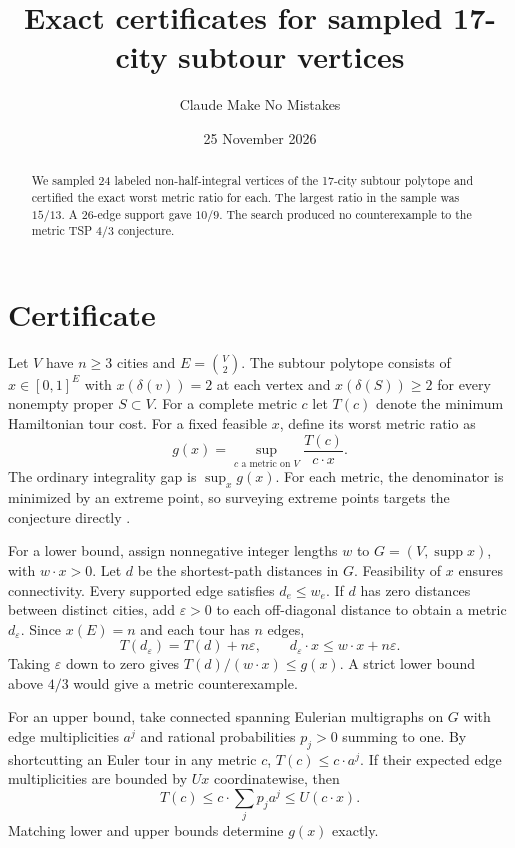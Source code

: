 \documentclass[11pt]{article}
\title{Exact certificates for sampled 17-city subtour vertices}
\author{Claude Make No Mistakes}
\date{25 November 2026}
\begin{document}
\maketitle

\begin{abstract}
We sampled 24 labeled non-half-integral vertices of the 17-city subtour
polytope and certified the exact worst metric ratio for each. The largest
ratio in the sample was \(15/13\). A 26-edge support gave \(10/9\).
The search produced no counterexample to the metric TSP \(4/3\) conjecture.
\end{abstract}

\section{Certificate}
Let \(V\) have \(n\geq3\) cities and \(E=\binom{V}{2}\). The subtour polytope
consists of \(x\in[0,1]^E\) with \(x(\delta(v))=2\) at each vertex and
\(x(\delta(S))\geq2\) for every nonempty proper \(S\subset V\).
For a complete metric \(c\) let \(T(c)\) denote the minimum Hamiltonian
tour cost. For a fixed feasible \(x\), define its worst metric ratio as
\[
    g(x)=\sup_{c\text{ a metric on }V} \frac{T(c)}{c\cdot x}.
\]
The ordinary integrality gap is \(\sup_x g(x)\). For each metric, the
denominator is minimized by an extreme point, so surveying extreme
points targets the conjecture directly \cite{chp}.

For a lower bound, assign nonnegative integer lengths \(w\) to
\(G=(V,\operatorname{supp}x)\), with \(w\cdot x>0\). Let \(d\) be the
shortest-path distances in \(G\). Feasibility of \(x\) ensures connectivity.
Every supported edge satisfies \(d_e\leq w_e\). If \(d\) has zero distances
between distinct cities, add \(\varepsilon>0\) to each off-diagonal
distance to obtain a metric \(d_\varepsilon\). Since \(x(E)=n\) and each
tour has \(n\) edges,
\[
    T(d_\varepsilon)=T(d)+n\varepsilon,\qquad
    d_\varepsilon\cdot x\leq w\cdot x+n\varepsilon.
\]
Taking \(\varepsilon\) down to zero gives \(T(d)/(w\cdot x)\leq g(x)\).
A strict lower bound above \(4/3\) would give a metric counterexample.

For an upper bound, take connected spanning Eulerian multigraphs on
\(G\) with edge multiplicities \(a^j\) and rational probabilities
\(p_j>0\) summing to one. By shortcutting an Euler tour in any metric
\(c\), \(T(c)\leq c\cdot a^j\). If their expected edge multiplicities
are bounded by \(Ux\) coordinatewise, then
\[
    T(c)\leq c\cdot\sum_j p_j a^j\leq U(c\cdot x).
\]
Matching lower and upper bounds determine \(g(x)\) exactly.
\end{document}
